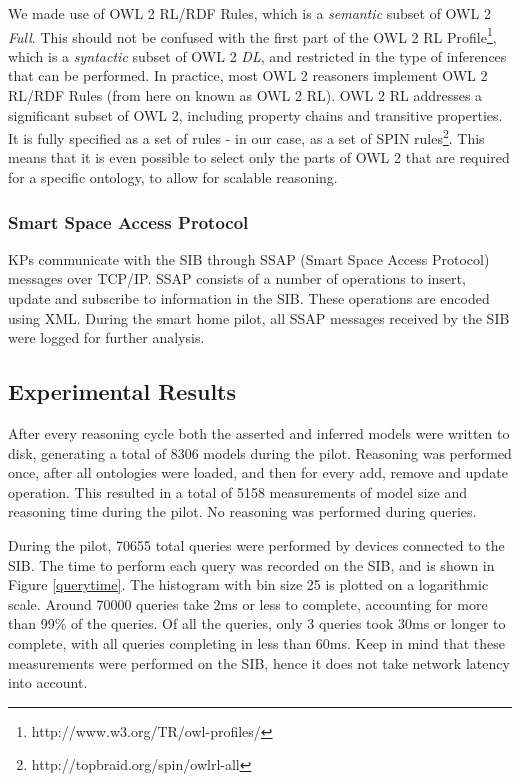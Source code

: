 
We made use of OWL 2 RL/RDF Rules, which is a \emph{semantic} subset of OWL 2 \emph{Full}. This should not be confused with the first part of the OWL 2 RL Profile\footnote{http://www.w3.org/TR/owl-profiles/}, which is a \emph{syntactic} subset of OWL 2 \emph{DL}, and restricted in the type of inferences that can be performed. In practice, most OWL 2 reasoners implement OWL 2 RL/RDF Rules (from here on known as OWL 2 RL). OWL 2 RL addresses a significant subset of OWL 2, including property chains and transitive properties. It is fully specified as a set of rules - in our case, as a set of SPIN rules\footnote{ http://topbraid.org/spin/owlrl-all}. This means that it is even possible to select only the parts of OWL 2 that are required for a specific ontology, to allow for scalable reasoning.

\subsubsection{Smart Space Access Protocol}

KPs communicate with the SIB through SSAP (Smart Space Access Protocol) messages \cite{Honkola2010} over TCP/IP. SSAP consists of a number of operations to insert, update and subscribe to information in the SIB. These operations are encoded using XML. During the smart home pilot, all SSAP messages received by the SIB were logged for further analysis.

\subsection{Experimental Results}
\label{results}

After every reasoning cycle both the asserted and inferred models were written to disk, generating a total of 8306 models during the pilot. Reasoning was performed once, after all ontologies were loaded, and then for every add, remove and update operation. This resulted in a total of 5158 measurements of model size and reasoning time during the pilot. No reasoning was performed during queries.

During the pilot, 70655 total queries were performed by devices connected to the SIB. The time to perform each query was recorded on the SIB, and is shown in Figure \ref{querytime}. The histogram with bin size 25 is plotted on a logarithmic scale. Around 70000 queries take 2ms or less to complete, accounting for more than 99\% of the queries. Of all the queries, only 3 queries took 30ms or longer to complete, with all queries completing in less than 60ms. Keep in mind that these measurements were performed on the SIB, hence it does not take network latency into account.


